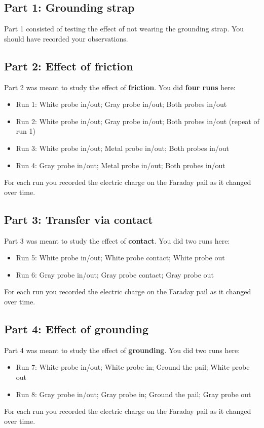 \subsection{Part 1: Grounding strap}
Part 1 consisted of testing the effect of not wearing the grounding strap. You should have recorded your observations.
\subsection{Part 2: Effect of friction}
Part 2 was meant to study the effect of \textbf{friction}. You did \textbf{four runs} here:
\begin{itemize}
	\item Run 1: White probe in/out; Gray probe in/out; Both probes in/out
	\item Run 2: White probe in/out; Gray probe in/out; Both probes in/out (repeat of run 1)
	\item Run 3: White probe in/out; Metal probe in/out; Both probes in/out
	\item Run 4: Gray probe in/out; Metal probe in/out; Both probes in/out
\end{itemize}
For each run you recorded the electric charge on the Faraday pail as it changed over time.
\subsection{Part 3: Transfer via contact}
Part 3 was meant to study the effect of \textbf{contact}. You did two runs here:
\begin{itemize}
	\item Run 5: White probe in/out; White probe contact; White probe out
	\item Run 6: Gray probe in/out; Gray probe contact; Gray probe out
\end{itemize}
For each run you recorded the electric charge on the Faraday pail as it changed over time.
\subsection{Part 4: Effect of grounding}
Part 4 was meant to study the effect of \textbf{grounding}. You did two runs here:
\begin{itemize}
	\item Run 7: White probe in/out; White probe in; Ground the pail; White probe out
	\item Run 8: Gray probe in/out; Gray probe in; Ground the pail; Gray probe out
\end{itemize}
For each run you recorded the electric charge on the Faraday pail as it changed over time.
